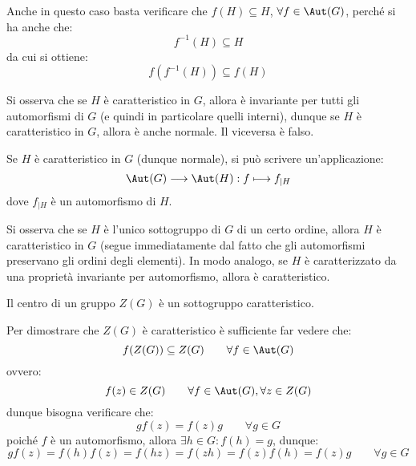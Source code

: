 \documentclass[11pt]{scrartcl}
\begin{document}
Anche in questo caso basta verificare che $f(H) \subseteq H$, $\forall f \in \Aut(G)$, perché si ha anche che:
    \[ f^{-1}(H) \subseteq H
        \]
da cui si ottiene:
    \[ f(f^{-1}(H)) \subseteq f(H)
        \]

\begin{remark}
    Si osserva che se $H$ è caratteristico in $G$, allora è invariante per tutti gli automorfismi di $G$ (e quindi in particolare quelli interni), dunque
    se $H$ è caratteristico in $G$, allora è anche normale. Il viceversa è falso.
\end{remark}

\begin{remark}
    Se $H$ è caratteristico in $G$ (dunque normale), si può scrivere un'applicazione:
        \[ \Aut(G) \longrightarrow \Aut(H) : f \longmapsto f_{\mid H}
            \]
    dove $f_{\mid H}$ è un automorfismo di $H$.
\end{remark}

\begin{remark}
    Si osserva che se $H$ è l'unico sottogruppo di $G$ di un certo ordine, allora $H$ è caratteristico in $G$ (segue immediatamente dal fatto che gli automorfismi
    preservano gli ordini degli elementi). In modo analogo, se $H$ è caratterizzato da una proprietà invariante per automorfismo, allora è caratteristico.
\end{remark}

\begin{exercise}
    Il centro di un gruppo $Z(G)$ è un sottogruppo caratteristico.
\end{exercise}
        
\begin{soln}
    Per dimostrare che $Z(G)$ è caratteristico è sufficiente far vedere che:
        \[ f(Z(G)) \subseteq Z(G)
        \qquad \forall f \in \Aut(G)
            \]
    ovvero:
        \[ f(z) \in Z(G)
        \qquad \forall f \in \Aut(G), \forall z \in Z(G)
            \]
    dunque bisogna verificare che:
        \[ gf(z) = f(z)g \qquad \forall g \in G
            \]
    poiché $f$ è un automorfismo, allora $\exists h \in G : f(h) = g$, dunque:
        \[ gf(z) = f(h)f(z) = f(hz) = f(zh) = f(z)f(h) = f(z)g \qquad \forall g \in G
            \]
\end{soln}
\end{document}
